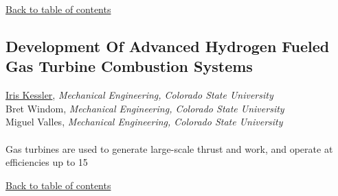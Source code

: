 \begin{flushright}\vspace{-0.2 in}\hyperlink{toc}{Back to table of contents}\end{flushright}\vspace{-0.2 in}
\hypertarget{IrisKessler}{\subsection*{\color{CUGOLD} Development Of Advanced Hydrogen Fueled Gas Turbine Combustion Systems}} \vsp 
\underline{Iris Kessler}, \textit{Mechanical Engineering, Colorado State University}\\ 
{Bret Windom}, \textit{Mechanical Engineering, Colorado State University}\\ 
{Miguel Valles}, \textit{Mechanical Engineering, Colorado State University}\\ 
\vspace{-0.1 in} \\ 
\noindent Gas turbines are used to generate large-scale thrust and work, and operate at efficiencies up to 15%
\begin{flushright}\vspace{-0.2 in}\hyperlink{toc}{Back to table of contents}\end{flushright}\vspace{-0.2 in}
